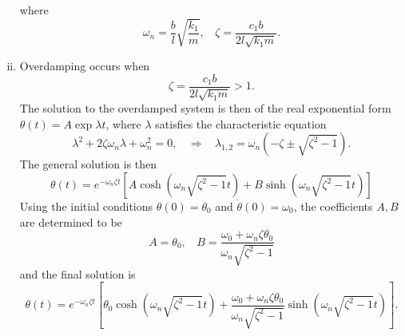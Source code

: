 \begin{enumerate}[(i)]
{    where 
    \begin{equation*}
        \boxed{\omega_n = \frac{b}{l}\sqrt{\frac{k_1}{m}}, ~~~~ \zeta = \frac{c_1 b}{2l \sqrt{k_1 m}}}.
    \end{equation*}
}
\item { %
    Overdamping occurs when 
    \begin{equation}
        \boxed{\zeta = \frac{c_1 b}{2l \sqrt{k_1 m}} > 1}.
    \end{equation}
    The solution to the overdamped system is then of the real exponential form $\theta(t) = A \exp{\lambda t}$, where $\lambda$ satisfies the characteristic equation
    \begin{equation}
        \lambda^2 + 2\zeta \omega_n \lambda + \omega_n^2 = 0, ~~~~ \Rightarrow ~~~~ \lambda_{1,2} = \omega_n \left(-\zeta \pm \sqrt{\zeta^2 - 1} \right).
    \end{equation}
    The general solution is then 
    \begin{equation}
        \theta(t) = e^{-\omega_n \zeta t} \left[A \cosh \left(\omega_n \sqrt{\zeta^2 - 1} t \right) + B \sinh \left( \omega_n \sqrt{\zeta^2 - 1} t \right) \right]
    \end{equation}
    Using the initial conditions $\theta(0) = \theta_0$ and $\dot{\theta}(0) = \omega_0$, the coefficients $A, B$ are determined to be 
    \begin{equation}
        A = \theta_0, ~~~~ B = \frac{\omega_0 + \omega_n \zeta \theta_0}{\omega_n \sqrt{\zeta^2 - 1}}
    \end{equation}
    and the final solution is 
    \begin{equation}
        \boxed{\theta(t) = e^{-\omega_n \zeta t} \left[ \theta_0 \cosh \left(\omega_n \sqrt{\zeta^2 - 1} t \right) + \frac{\omega_0 + \omega_n \zeta \theta_0}{\omega_n \sqrt{\zeta^2 - 1}} \sinh \left( \omega_n \sqrt{\zeta^2 - 1} t \right) \right]}.
    \end{equation}
}
\end{enumerate}

